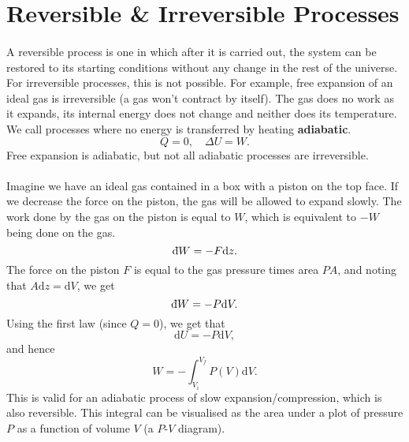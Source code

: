 \documentclass[../thermodynamics.tex]{subfiles}
\begin{document}
    \section{Reversible \& Irreversible Processes}
        \paragraph{}
        A reversible process is one in which after it is carried out, the system can be restored to its starting conditions without any change in the rest of the universe.
        For irreversible processes, this is not possible.
        For example, free expansion of an ideal gas is irreversible (a gas won't contract by itself).
        The gas does no work as it expands, its internal energy does not change and neither does its temperature.
        We call processes where no energy is transferred by heating \textbf{adiabatic}.
        \begin{equation}
            Q=0,\quad\Delta U=W.
        \end{equation}
        Free expansion is adiabatic, but not all adiabatic processes are irreversible.

        \paragraph{}
        Imagine we have an ideal gas contained in a box with a piston on the top face.
        If we decrease the force on the piston, the gas will be allowed to expand slowly.
        The work done by the gas on the piston is equal to $W$, which is equivalent to $-W$ being done on the gas.
        \begin{equation}
            \dbar{W}=-F\mathrm{d}z.
        \end{equation}
        The force on the piston $F$ is equal to the gas pressure times area $PA$, and noting that $A\mathrm{d}z=\mathrm{d}V$, we get
        \begin{equation}
            \dbar{W}=-P\mathrm{d}V.
        \end{equation}
        Using the first law (since $Q=0$), we get that
        \begin{equation}
            \mathrm{d}U=-P\mathrm{d}V,
        \end{equation}
        and hence
        \begin{equation}
            W=-\int_{V_i}^{V_f}P(V)\mathrm{d}V.
        \end{equation}
        This is valid for an adiabatic process of slow expansion/compression, which is also reversible.
        This integral can be visualised as the area under a plot of pressure $P$ as a function of volume $V$ (a $P$-$V$ diagram).
\end{document}
